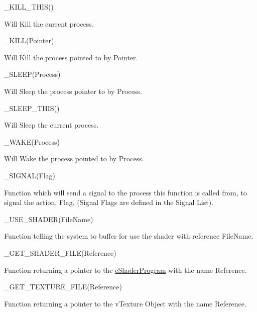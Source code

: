 \begin{DoxyItemize}
\item \_\-KILL\_\-THIS()
\begin{DoxyItemize}
\item Will Kill the current process.
\end{DoxyItemize}
\item \_\-KILL(Pointer)
\begin{DoxyItemize}
\item Will Kill the process pointed to by Pointer.
\end{DoxyItemize}
\item \_\-SLEEP(Process)
\begin{DoxyItemize}
\item Will Sleep the process pointer to by Process.
\end{DoxyItemize}
\item \_\-SLEEP\_\-THIS()
\begin{DoxyItemize}
\item Will Sleep the current process.
\end{DoxyItemize}
\item \_\-WAKE(Process)
\begin{DoxyItemize}
\item Will Wake the process pointed to by Process.
\end{DoxyItemize}
\item \_\-SIGNAL(Flag)
\begin{DoxyItemize}
\item Function which will send a signal to the process this function is called from, to signal the action, Flag. (Signal Flags are defined in the Signal List).
\end{DoxyItemize}
\item \_\-USE\_\-SHADER(FileName)
\begin{DoxyItemize}
\item Function telling the system to buffer for use the shader with reference FileName.
\end{DoxyItemize}
\item \_\-GET\_\-SHADER\_\-FILE(Reference)
\begin{DoxyItemize}
\item Function returning a pointer to the \hyperlink{classc_shader_program}{cShaderProgram} with the name Reference.
\end{DoxyItemize}
\item \_\-GET\_\-TEXTURE\_\-FILE(Reference)
\begin{DoxyItemize}
\item Function returning a pointer to the vTexture Object with the name Reference.

\end{DoxyItemize}
\end{DoxyItemize}
